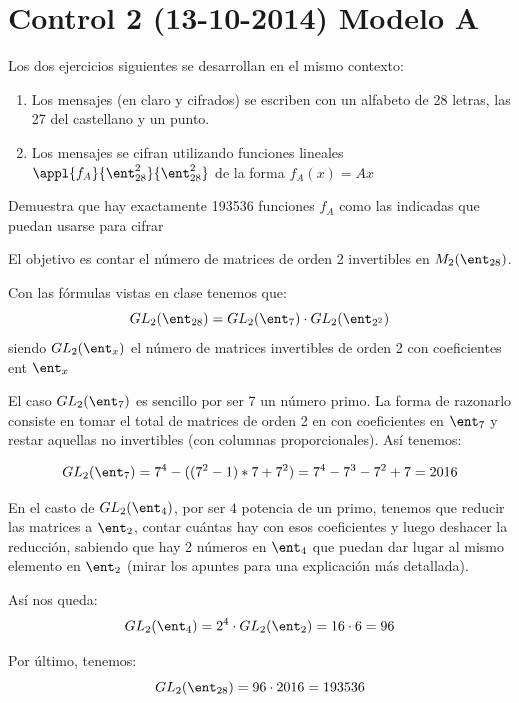 \section{Control 2 (13-10-2014) Modelo A}

Los dos ejercicios siguientes se desarrollan en el mismo contexto:

\begin{enumerate}
\item Los mensajes (en claro y cifrados) se escriben con un alfabeto de 28 letras, las 27 del castellano y un punto.

\item Los mensajes se cifran utilizando funciones lineales $\appl{f_A}{\ent_{28}^2}{\ent_{28}^2}$ de la forma $f_A(x) = Ax$
\end{enumerate}

\begin{problem}[1]
Demuestra que hay exactamente 193536 funciones $f_A$ como las indicadas que puedan usarse para cifrar

\solution
{}

El objetivo es contar el número de matrices de orden 2 invertibles en $M_2(\ent_{28})$.

Con las fórmulas vistas en clase tenemos que:
\[GL_2(\ent_{28})=GL_2(\ent_{7})\cdot GL_2(\ent_{2^2})\]
siendo $GL_2(\ent_x)$ el número de matrices invertibles de orden 2 con coeficientes ent $\ent_x$

El caso $GL_2(\ent_7)$ es sencillo por ser 7 un número primo. La forma de razonarlo consiste en tomar el total de matrices de orden 2 en con coeficientes en $\ent_7$ y restar aquellas no invertibles (con columnas proporcionales). Así tenemos:

\[GL_2(\ent_7) = 7^4 -((7^2 -1)*7+7^2) = 7^4 -7^3-7^2+7 = 2016\]

En el casto de $GL_2(\ent_4)$, por ser $4$ potencia de un primo, tenemos que reducir las matrices a $\ent_2$, contar cuántas hay con esos coeficientes y luego deshacer la reducción, sabiendo que hay 2 números en $\ent_4$ que puedan dar lugar al mismo elemento en $\ent_2$ (mirar los apuntes para una explicación más detallada).

Así nos queda:
\[GL_2(\ent_4) = 2^4 \cdot GL_2(\ent_2)=16 \cdot 6 = 96\]

Por último, tenemos:
\[GL_2(\ent_{28}) = 96 \cdot 2016 = 193536\]



\end{problem}

